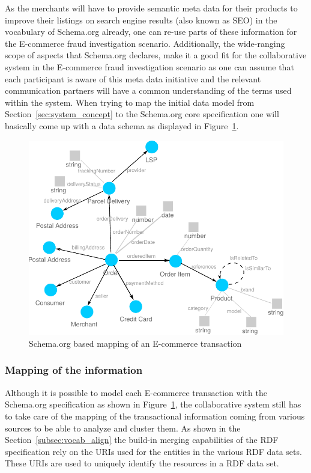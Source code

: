 As the merchants will have to provide semantic meta data for their products to improve their listings on search engine results (also known as \gls{SEO}) in the vocabulary of Schema.org already, one can re-use parts of these information for the \gls{E-commerce} fraud investigation scenario. Additionally, the wide-ranging scope of aspects that Schema.org declares, make it a good fit for the collaborative system in the \gls{E-commerce} fraud investigation scenario as one can assume that each participant is aware of this meta data initiative and the relevant communication partners will have a common understanding of the terms used within the system. When trying to map the initial data model from Section~\ref{sec:system_concept} to the Schema.org core specification one will basically come up with a data schema as displayed in Figure~\ref{fig:images_schema_org}. \@

\begin{figure}[!ht]
	\centering
		\includegraphics[width=0.8\columnwidth]{images/schema_org_mapping.pdf}
	\caption{Schema.org based mapping of an \gls{E-commerce} transaction}
\label{fig:images_schema_org}
\end{figure}

\subsubsection{Mapping of the information}
\label{subsub:rdf_mapping_information}

Although it is possible to model each \gls{E-commerce} transaction with the Schema.org specification as shown in Figure~\ref{fig:images_schema_org}, the collaborative system still has to take care of the mapping of the transactional information coming from various sources to be able to analyze and cluster them. As shown in the Section~\ref{subsec:vocab_align} the build-in merging capabilities of the \gls{RDF} specification rely on the \gls{URI}s used for the entities in the various \gls{RDF} data sets. These \gls{URI}s are used to uniquely identify the resources in a \gls{RDF} data set. \\


